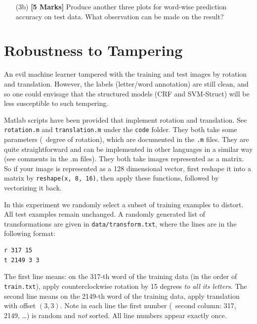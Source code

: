 \documentclass[11pt]{report}
\begin{document}
\begin{itemize}
	\item[(3b)] {\bf [5 Marks]} Produce another three plots for word-wise prediction accuracy on test data.  What observation can be made on the result?
\end{itemize}


\section{Robustness to Tampering}

An evil machine learner tampered with the training and test images by rotation and translation.
However, the labels (letter/word annotation) are still clean, and so
one could envisage that the structured models (CRF and SVM-Struct) will be less susceptible to such tempering.


Matlab scripts have been provided that implement rotation and translation.
See \verb#rotation.m# and \verb#translation.m# under the \verb#code# folder.
They both take some parameters (\eg\ degree of rotation), which are documented in the \verb#.m# files.
They are quite straightforward and can be implemented in other languages in a similar way (see comments in the .m files).
They both take images represented as a matrix.
So if your image is represented as a 128 dimensional vector,
first reshape it into a matrix by \verb#reshape(x, 8, 16)#,
then apply these functions,
followed by vectorizing it back.


In this experiment
we randomly select a subset of training examples to distort.
All test examples remain unchanged.
A randomly generated list of transformations are given in \verb#data/transform.txt#, where the lines are in the following format:
%
\begin{verbatim}
r 317 15
t 2149 3 3
\end{verbatim}
The first line means: on the 317-th word of the training data (in the order of \verb#train.txt#),
apply counterclockwise rotation by 15 degrees \emph{to all its letters}.
The second line means on the 2149-th word of the training data, apply translation with offset $(3,3)$.
Note in each line the first number (\ie\ second column: 317, 2149, \ldots) is random and \emph{not} sorted.
All line numbers appear exactly once.
\end{document}
